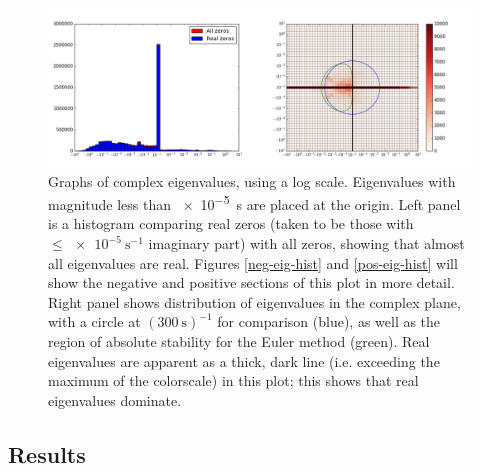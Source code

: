 \documentclass [11pt, proquest] {uwthesis}[2020/02/24]
\begin{document}
\begin{figure}[ht]
  \includegraphics[width=6.5in]{./MG2Figure1.png}
  \caption{Graphs of complex eigenvalues, using a log scale. Eigenvalues with magnitude less than \SI{e-5}{\second} are placed at the origin. Left panel is a histogram comparing real zeros (taken to be those with $\le \SI{e-5}{\second^{-1}}$ imaginary part) with all zeros, showing that almost all eigenvalues are real. Figures \ref{neg-eig-hist} and \ref{pos-eig-hist} will show the negative and positive sections of this plot in more detail. Right panel shows distribution of eigenvalues in the complex plane, with a circle at $(\SI{300}{\second})^{-1}$ for comparison (blue), as well as the region of absolute stability for the Euler method (green). Real eigenvalues are apparent as a thick, dark line (i.e. exceeding the maximum of the colorscale) in this plot; this shows that real eigenvalues dominate.}
  \label{complex-eigs}
\end{figure}

\subsection{Results}

\label{sec:timescales-results}
\end{document}
